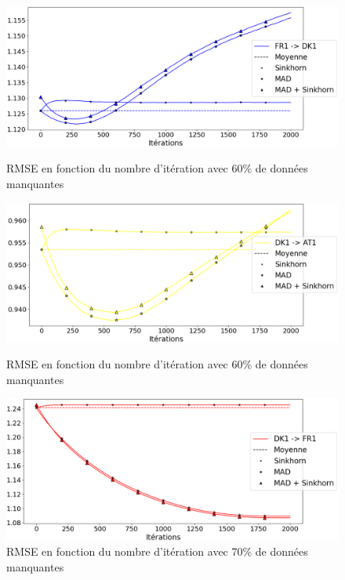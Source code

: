\documentclass[acmsmall, natbib=false, nonacm]{acmart}
\begin{document}
\begin{figure}[H]
    \begin{minipage}[b]{0.4\linewidth}
		\centering \includegraphics[scale=0.14]{images/60_biais_DK1.png}
		\caption{RMSE en fonction du nombre d'itération avec 60\% de données manquantes}
	\end{minipage}\hfill
    \begin{minipage}[b]{0.4\linewidth}
		\centering \includegraphics[scale=0.14]{images/60_biais_AT1.png}
		\caption{RMSE en fonction du nombre d'itération avec 60\% de données manquantes}
	\end{minipage}\hfill
    \begin{minipage}[b]{0.4\linewidth}
		\centering \includegraphics[scale=0.14]{images/70_biais_FR1.png}
		\caption{RMSE en fonction du nombre d'itération avec 70\% de données manquantes}
	\end{minipage}\hfill

\end{figure}
\end{document}
